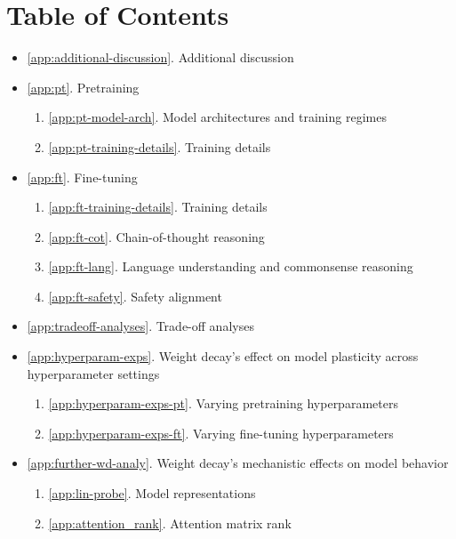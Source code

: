 \section*{Table of Contents}

\vspace{0.2cm}

\begin{itemize}
  \item \ref{app:additional-discussion}. Additional discussion
  \item \ref{app:pt}. Pretraining
        \begin{enumerate}
            \item[-] \ref{app:pt-model-arch}. Model architectures and training regimes
            \item[-] \ref{app:pt-training-details}. Training details
        \end{enumerate}
  \item \ref{app:ft}. Fine-tuning
        \begin{enumerate}
            \item[-] \ref{app:ft-training-details}. Training details
            \item[-] \ref{app:ft-cot}. Chain-of-thought reasoning
            \item[-] \ref{app:ft-lang}. Language understanding and commonsense reasoning
            \item[-] \ref{app:ft-safety}. Safety alignment
        \end{enumerate}
  \item \ref{app:tradeoff-analyses}. Trade-off analyses
  \item \ref{app:hyperparam-exps}. Weight decay’s effect on model plasticity across hyperparameter settings
        \begin{enumerate}
            \item[-] \ref{app:hyperparam-exps-pt}. Varying pretraining hyperparameters
            \item[-] \ref{app:hyperparam-exps-ft}. Varying fine-tuning hyperparameters
        \end{enumerate}
  \item \ref{app:further-wd-analy}. Weight decay's mechanistic effects on model behavior
        \begin{enumerate}
            \item[-] \ref{app:lin-probe}. Model representations
            \item[-] \ref{app:attention_rank}. Attention matrix rank
        \end{enumerate}
\end{itemize}